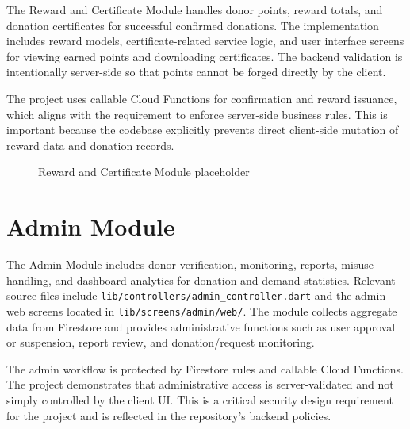 The Reward and Certificate Module handles donor points, reward totals, and donation certificates for successful confirmed donations. The implementation includes reward models, certificate-related service logic, and user interface screens for viewing earned points and downloading certificates. The backend validation is intentionally server-side so that points cannot be forged directly by the client.

The project uses callable Cloud Functions for confirmation and reward issuance, which aligns with the requirement to enforce server-side business rules. This is important because the codebase explicitly prevents direct client-side mutation of reward data and donation records.

\begin{figure}[H]
\centering
{}
\caption{Reward and Certificate Module placeholder}
\end{figure}


\section{Admin Module}

The Admin Module includes donor verification, monitoring, reports, misuse handling, and dashboard analytics for donation and demand statistics. Relevant source files include \texttt{lib/controllers/admin_controller.dart} and the admin web screens located in \texttt{lib/screens/admin/web/}. The module collects aggregate data from Firestore and provides administrative functions such as user approval or suspension, report review, and donation/request monitoring.

The admin workflow is protected by Firestore rules and callable Cloud Functions. The project demonstrates that administrative access is server-validated and not simply controlled by the client UI. This is a critical security design requirement for the project and is reflected in the repository's backend policies.

